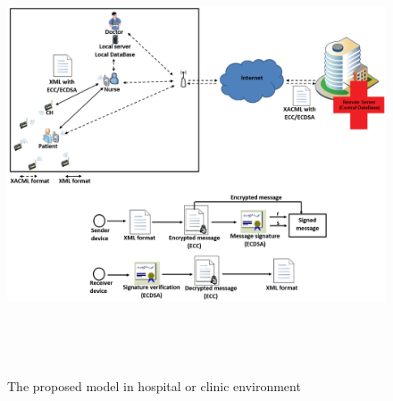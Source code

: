 \documentclass[a4paper,11pt]{article}
\begin{document}
\begin{figure}[t]
	\centering
		\includegraphics[width=15cm,height=13cm]{pic/poropsedmodel.png}
	\caption{The proposed model in hospital or clinic environment}
	\label{fig:poropsedmodel}
\end{figure}
\end{document}
